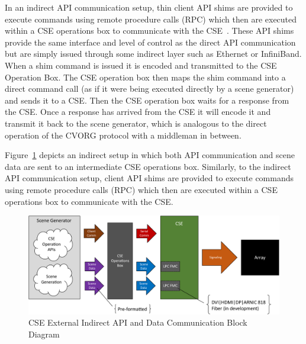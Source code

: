         In an indirect API communication setup, thin client API shims are provided to execute commands using remote procedure calls (RPC) which then are executed within a CSE operations box to communicate with the CSE~\cite{CampbellEtAl2019}. These API shims provide the same interface and level of control as the direct API communication but are simply issued through some indirect layer such as Ethernet or InfiniBand. When a shim command is issued it is encoded and transmitted to the CSE Operation Box. The CSE operation box then maps the shim command into a direct command call (as if it were being executed directly by a scene generator) and sends it to a CSE. Then the CSE operation box waits for a response from the CSE. Once a response has arrived from the CSE it will encode it and transmit it back to the scene generator, which is analogous to the direct operation of the CVORG protocol with a middleman in between.

        Figure~\ref{fig:external_cse_comm_indirect} depicts an indirect setup in which both API communication and scene data are sent to an intermediate CSE operations box. Similarly, to the indirect API communication setup, client API shims are provided to execute commands using remote procedure calls (RPC) which then are executed within a CSE operations box to communicate with the CSE.

        \begin{figure}
            \centering
            \includegraphics[width=1.0\textwidth]{fig/external_cse_comm_indirect.pdf}
            \caption{CSE External Indirect API and Data Communication Block Diagram}
            \label{fig:external_cse_comm_indirect}
        \end{figure}

